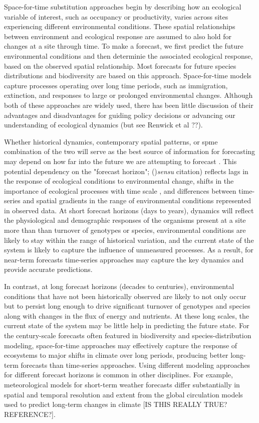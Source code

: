 \documentclass[11pt]{article}
\begin{document}
Space-for-time substitution approaches begin by describing how an ecological variable of interest, such as occupancy or productivity, 
varies across sites experiencing different environmental conditions. These spatial relationships between environment and ecological 
response are assumed to also hold for changes at a site through time. To make a forecast, we first predict the future
environmental conditions and then determinie the associated ecological response, based on the observed spatial relationship. 
Most forecasts for future species distributions and biodiversity are based on this approach. 
Space-for-time models capture processes operating over long time periods, such as
immigration, extinction, and responses to large or prolonged environmental changes. Although both of these approaches are
widely used, there has been little discussion of their advantages and disadvantages for guiding policy decisions or 
advancing our understanding of ecological dynamics \citep{harris_forecasting_2018} (but see Renwick et al ??).

Whether historical dynamics, contemporary spatial patterns, or spme combination of the two will serve as the best source of 
information for forecasting may depend on how far into the future we are attempting to forecast \citep{harris_forecasting_2018}. 
This potential dependency on the "forecast horizon"; ()\textit{sensu} citation)
reflects lags in the response of ecological conditions to environmental change, shifts in the importance of ecological processes with
time scale \citep{levin_1992,rosenzweig_1995}, and differences between time-series and spatial gradients in the range of 
environmental conditions represented in observed data.
At short forecast horizons (days to years), dynamics will reflect the physiological and demographic responses of 
the organisms present at a site more than than turnover of genotypes or species, 
environmental conditions are likely to stay within the range of historical variation, 
and the current state of the system is likely to capture the influence of unmeasured processes. As a result, 
for near-term forecasts time-series approaches may capture the key dynamics and provide accurate predictions.

In contrast, at long forecast horizons (decades to centuries),  environmental conditions that have not been 
historically observed are likely to not only occur but to persist long enough to drive significant turnover of genotypes and species 
along with changes in the flux of energy and nutrients.  At these long scales, the current state of the system may be 
little help in predicting the future state. For the century-scale forecasts often featured in biodiversity and 
species-distribution modeling, space-for-time approaches may effectively capture the response of ecosystems to major shifts 
in climate over long periods, producing better long-term forecasts than time-series approaches. 
Using different modeling approaches for different forecast horizons is common in other disciplines.
For example, meteorological models for short-term weather forecasts differ substantially in spatial
and temporal resolution and extent from the global circulation models used to predict long-term changes
in climate [IS THIS REALLY TRUE? REFERENCE?].
\end{document}
